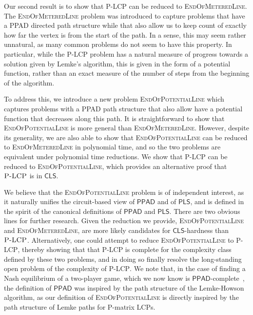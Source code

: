 \documentclass[a4paper,UKenglish]{lipics2}
\theoremstyle{definition}
\def\cc#1{\mathsf{#1}}
\def\CLS{\ensuremath{\cc{CLS}}\xspace}
\def\PPAD{\ensuremath{\cc{PPAD}}\xspace}
\def\problem#1{\textsc{#1}}
\def\EOPL{\problem{EndOfPotentialLine}\xspace}
\def\EOML{\problem{EndOfMeteredLine}\xspace}
\def\PLCP{\problem{P-LCP}\xspace}
\begin{document}
Our second result is to show that \PLCP can be reduced to \EOML.
The \EOML problem was introduced to capture problems that have a PPAD directed
path structure while that also allow us to keep count of exactly how far the vertex is from
the start of the path. In a sense, this may seem rather unnatural, as many common
problems do not seem to have this property. In particular, while the \PLCP problem
has a natural measure of progress towards a solution given by Lemke's algorithm, 
this is given in the form of a potential function, rather than an exact measure
of the number of steps from the beginning of the algorithm.

To address this, we introduce a new problem \EOPL which captures problems with a
PPAD path structure that also allow have a potential function that decreases
along this path. It is straightforward to show that \EOPL is more general than
\EOML. However, despite its generality, we are also able to show that \EOPL can
be reduced to \EOML in polynomial time, and so the two problems are equivalent
under polynomial time reductions.  We show that \PLCP can be reduced to \EOPL,
which provides an alternative proof that $\PLCP$ is in $\CLS$.

We believe that the \EOPL problem is of independent interest, as it naturally
unifies the circuit-based view of $\cc{PPAD}$ and of $\cc{PLS}$, and is defined
in the spirit of the canonical definitions of $\cc{PPAD}$ and $\cc{PLS}$.  There
are two obvious lines for further research.  Given the reduction we provide,
\EOPL and \EOML, are more likely candidates for $\CLS$-hardness than $\PLCP$. 
Alternatively, one could attempt to reduce \EOPL to \PLCP, thereby showing that
that \PLCP is complete for the complexity class defined by these two problems,
and in doing so finally resolve the long-standing open problem of the complexity
of \PLCP.
We note that, in the case of finding a Nash equilibrium of a two-player game,
which we now know is
\PPAD-complete~\cite{chen2009settling,daskalakis2009complexity}, the definition
of \PPAD was inspired by the path structure of the Lemke-Howson algorithm, as
our definition of \EOPL is directly inspired by the path structure of Lemke
paths for P-matrix LCPs.


\end{document}
